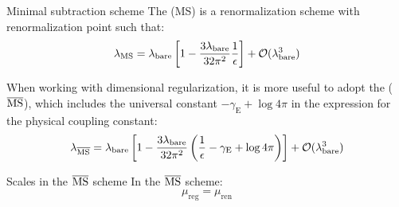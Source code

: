 \begin{definition}{Minimal subtraction scheme}{}
  The  (MS) is a renormalization scheme with renormalization point such that:
  \begin{equation}
    \lambda_\text{MS} = \lambda_\text{bare} \left[ 1 - \frac{3\lambda_\text{bare}}{32\pi^2} \frac{1}{\epsilon} \right] + \mathcal{O}(\lambda_\text{bare}^3)
  \end{equation}
\end{definition}

When working with dimensional regularization, it is more useful to adopt the  ($ \overline{\text{MS}} $), which includes the universal constant $ -\gamma_\text{E} + \log 4\pi $ in the expression for the physical coupling constant:
\begin{equation}
  \lambda_{\overline{\text{MS}}} = \lambda_\text{bare} \left[ 1 - \frac{3\lambda_\text{bare}}{32\pi^2} \left( \frac{1}{\epsilon} - \gamma_\text{E} + \log 4\pi \right) \right] + \mathcal{O}(\lambda_\text{bare}^3)
  \label{eq:l-msb}
\end{equation}

\begin{theorem}{Scales in the $ \overline{\text{MS}} $ scheme}{}
  In the $ \overline{\text{MS}} $ scheme:
  \begin{equation}
    \mu_\text{reg} = \mu_\text{ren}
  \end{equation}
\end{theorem}

